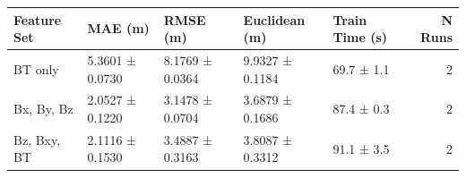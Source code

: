 \begin{tabular}{lllllr}
\toprule
Feature Set & MAE (m) & RMSE (m) & Euclidean (m) & Train Time (s) & N Runs \\
\midrule
BT only & 5.3601 ± 0.0730 & 8.1769 ± 0.0364 & 9.9327 ± 0.1184 & 69.7 ± 1.1 & 2 \\
Bx, By, Bz & 2.0527 ± 0.1220 & 3.1478 ± 0.0704 & 3.6879 ± 0.1686 & 87.4 ± 0.3 & 2 \\
Bz, Bxy, BT & 2.1116 ± 0.1530 & 3.4887 ± 0.3163 & 3.8087 ± 0.3312 & 91.1 ± 3.5 & 2 \\
\bottomrule
\end{tabular}
